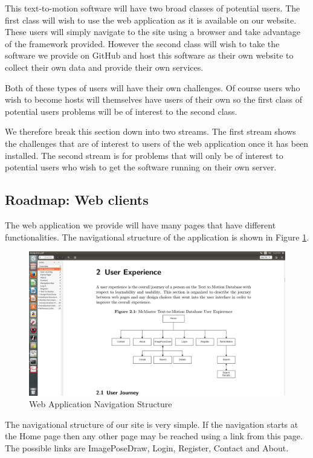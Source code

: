 \documentclass{scrreprt}
\begin{document}
This text-to-motion software will have two broad classes of potential users.
The first class will wish to use the web application as it is available on our
website.  These users will simply navigate to the site using a browser and take
advantage of the framework provided. However the second class will wish to take
the software we provide on GitHub and host this software as their own website
to collect their own data and provide their own services.

Both of these types of users will have their own challenges.  Of course users
who wish to become hosts will themselves have users of their own so the first
class of potential users problems will be of interest to the second class.

We therefore break this section down into two streams.  The first stream shows
the challenges that are of interest to users of the web application once it has
been installed.  The second stream is for problems that will only be of
interest to potential users who wish to get the software running on their own
server.

\subsection{Roadmap: Web clients}

The web application we provide will have many pages that have different
functionalities.  The navigational structure of the application is shown in
Figure \ref{fig:navStruct}.

\begin{figure}
  \includegraphics[width=\linewidth]{apppicture.png}
  \caption{Web Application Navigation Structure}
  \label{fig:navStruct}
\end{figure}

The navigational structure of our site is very simple.  If the navigation
starts at the Home page then any other page may be reached using a link from
this page.  The possible links are ImagePoseDraw, Login, Register, Contact and
About.
\end{document}
